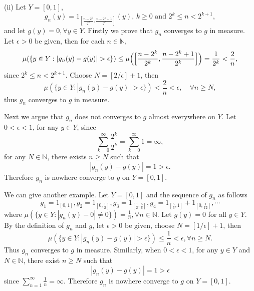 \documentclass[12pt,a4paper]{ctexart}
\begin{document}
(ii) Let $Y = [0,1]$, 
\begin{equation*}
    g_n(y) = 1_{[\frac{n-2^k}{2^k}, \frac{n-2^k+1}{2^k}]}(y), \, \text{$k \geq 0$ and $2^k \leq n < 2^{k+1}$},
\end{equation*}
and let $g(y) =0, \forall y \in Y$. Firstly we prove that $g_n$ converges to $g$ in measure. Let $\epsilon > 0$ be given, then for each $n \in \mathbb N$,
\begin{equation*}
    \mu(\{y \in Y: |g_n(y) - g(y)| > \epsilon\}) \leq \mu \Big{(} \Big{[} \frac{n-2^k}{2^k}, \frac{n-2^k+1}{2^k} \Big{]} \Big{)} = \frac{1}{2^k} < \frac{2}{n},
\end{equation*}
since $2^k \leq n < 2^{k+1}$. Choose $N = [2/\epsilon] + 1$, then 
\begin{equation*}
    \mu(\{y \in Y: |g_n(y) - g(y)| > \epsilon\}) < \frac{2}{n} < \epsilon, \quad \forall n \geq N,
\end{equation*}
thus $g_n$ converges to $g$ in measure.

Next we argue that $g_n$ does not converges to $g$ almost everywhere on $Y$. Let $0 < \epsilon < 1$, for any $y \in Y$, since 
\begin{equation*}
    \sum_{k = 0}^{\infty} \frac{2^k}{2^k} = \sum_{k = 0}^{\infty} 1 = \infty, 
\end{equation*}
for any $N \in \mathbb N$, there exists $n \geq N$ such that
\begin{equation*}
    |g_n(y) - g(y)| = 1 > \epsilon.
\end{equation*}
Therefore $g_n$ is nowhere converge to $g$ on $Y = [0,1]$.

We can give another example. Let $Y = [0,1]$
and the sequence of $g_n$ as follows
\begin{equation*}
    g_1 = 1_{[0,1]}, g_2 = 1_{[0,\frac{1}{2}]}, g_3 = 1_{[\frac{1}{2}, \frac{5}{6}]},
    g_4 = 1_{[\frac{5}{6},1]} + 1_{[0, \frac{1}{12}]}, \cdots
\end{equation*}
where $\mu(\{y \in Y: |g_n(y) - 0| \neq 0\}) = \frac{1}{n}, \forall n \in \mathbb N$. Let $g(y) = 0$ for all $y \in Y$. By the definition of $g_n$ and $g$, let $\epsilon > 0$ be given, choose $N = [1/\epsilon] +1$, then
\begin{equation*}
    \mu(\{y \in Y: |g_n(y) - g(y)| > \epsilon \}) \leq \frac{1}{n} < \epsilon, \forall n \geq N.
\end{equation*}
Thus $g_n$ converges to $g$ in measure. Similarly, when $0 < \epsilon < 1$, for any $y \in Y$ and $N \in \mathbb N$, there exist $n \geq N$ such that
\begin{equation*}
    |g_n(y) - g(y)| = 1 > \epsilon
\end{equation*}
since $\sum_{n=1}^{\infty} \frac{1}{n} = \infty$. Therefore $g_n$ is nowhere converge to $g$ on $Y = [0,1]$.
\end{document}
